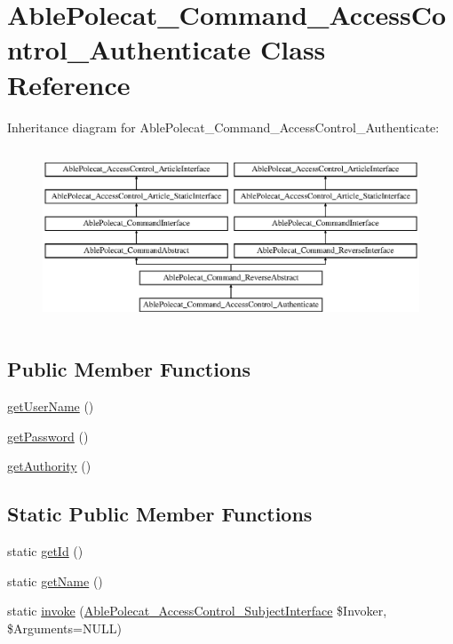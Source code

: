\hypertarget{class_able_polecat___command___access_control___authenticate}{}\section{Able\+Polecat\+\_\+\+Command\+\_\+\+Access\+Control\+\_\+\+Authenticate Class Reference}
\label{class_able_polecat___command___access_control___authenticate}
Inheritance diagram for Able\+Polecat\+\_\+\+Command\+\_\+\+Access\+Control\+\_\+\+Authenticate\+:\begin{figure}[H]
\begin{center}
\leavevmode
\includegraphics[height=5.299685cm]{class_able_polecat___command___access_control___authenticate}
\end{center}
\end{figure}
\subsection*{Public Member Functions}
\begin{DoxyCompactItemize}
\item 
\hyperlink{class_able_polecat___command___access_control___authenticate_aafd6d1ef27e6acc5833aba4012e5ee77}{get\+User\+Name} ()
\item 
\hyperlink{class_able_polecat___command___access_control___authenticate_a04e0957baeb7acde9c0c86556da2d43f}{get\+Password} ()
\item 
\hyperlink{class_able_polecat___command___access_control___authenticate_a1f73860dd14340c5bad9094f0b5b97c2}{get\+Authority} ()
\end{DoxyCompactItemize}
\subsection*{Static Public Member Functions}
\begin{DoxyCompactItemize}
\item 
static \hyperlink{class_able_polecat___command___access_control___authenticate_acfaa3a96d0cb5a4c0d4d710dcba41e9e}{get\+Id} ()
\item 
static \hyperlink{class_able_polecat___command___access_control___authenticate_a4ef9bd37ba3ce8a13c1e8bcf4f72a630}{get\+Name} ()
\item 
static \hyperlink{class_able_polecat___command___access_control___authenticate_a6821480fe527af0afdf3691d7cffad5f}{invoke} (\hyperlink{interface_able_polecat___access_control___subject_interface}{Able\+Polecat\+\_\+\+Access\+Control\+\_\+\+Subject\+Interface} \$Invoker, \$Arguments=N\+U\+L\+L)
\end{DoxyCompactItemize}
